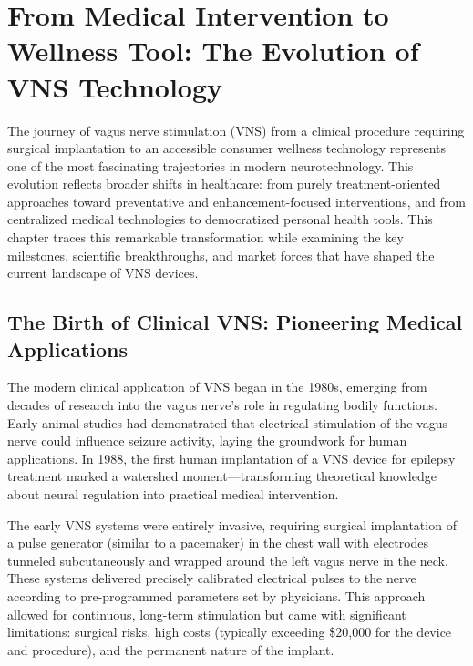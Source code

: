 \documentclass[
  Letterpaper,
]{scrbook}
\begin{document}

\chapter{From Medical Intervention to Wellness Tool: The Evolution of
VNS
Technology}\label{from-medical-intervention-to-wellness-tool-the-evolution-of-vns-technology}

The journey of vagus nerve stimulation (VNS) from a clinical procedure
requiring surgical implantation to an accessible consumer wellness
technology represents one of the most fascinating trajectories in modern
neurotechnology. This evolution reflects broader shifts in healthcare:
from purely treatment-oriented approaches toward preventative and
enhancement-focused interventions, and from centralized medical
technologies to democratized personal health tools. This chapter traces
this remarkable transformation while examining the key milestones,
scientific breakthroughs, and market forces that have shaped the current
landscape of VNS devices.

\section{The Birth of Clinical VNS: Pioneering Medical
Applications}\label{the-birth-of-clinical-vns-pioneering-medical-applications}

The modern clinical application of VNS began in the 1980s, emerging from
decades of research into the vagus nerve's role in regulating bodily
functions. Early animal studies had demonstrated that electrical
stimulation of the vagus nerve could influence seizure activity, laying
the groundwork for human applications. In 1988, the first human
implantation of a VNS device for epilepsy treatment marked a watershed
moment---transforming theoretical knowledge about neural regulation into
practical medical intervention.

The early VNS systems were entirely invasive, requiring surgical
implantation of a pulse generator (similar to a pacemaker) in the chest
wall with electrodes tunneled subcutaneously and wrapped around the left
vagus nerve in the neck. These systems delivered precisely calibrated
electrical pulses to the nerve according to pre-programmed parameters
set by physicians. This approach allowed for continuous, long-term
stimulation but came with significant limitations: surgical risks, high
costs (typically exceeding \$20,000 for the device and procedure), and
the permanent nature of the implant.
\end{document}
